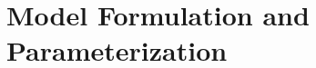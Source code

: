 \documentclass[preprint]{elsarticle}
\begin{document}

\section{Model Formulation and Parameterization}\label{Sec2}
\end{document}
